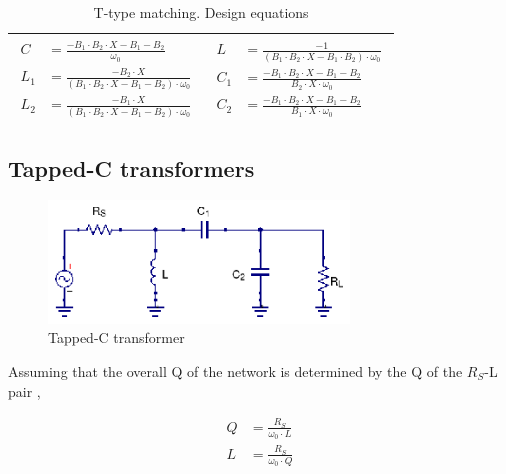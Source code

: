 \begin{table}[H]
\begin{tabular}{ | c | c | }
    \begin{minipage}{.4\textwidth}
         {\begin{align}
           C &= \frac{-B_1 \cdot B_2 \cdot X - B_1 - B_2}{\omega_0}\\
           L_1 &= \frac{-B_2 \cdot X}{(B_1 \cdot B_2 \cdot X - B_1 - B_2) \cdot \omega_0}\\
           L_2 &= \frac{-B_1 \cdot X}{(B_1 \cdot B_2 \cdot X - B_1 - B_2) \cdot \omega_0}
         \end{align}}
    \end{minipage}
    &
        \begin{minipage}{.4\textwidth}
         {\begin{align}
           L &= \frac{-1}{(B_1 \cdot B_2 \cdot X - B_1 \cdot B_2) \cdot \omega_0}\\
           C_1 &= \frac{-B_1 \cdot B_2 \cdot X - B_1 - B_2}{B_2 \cdot X \cdot \omega_0}\\
           C_2 &= \frac{-B_1 \cdot B_2 \cdot X - B_1 - B_2}{B_1 \cdot X \cdot \omega_0}
         \end{align}}
    \end{minipage}
    \\ \hline
  \end{tabular}
  \caption{T-type matching. Design equations}
  \label{tbl:tee-matching}
\end{table}

\subsection{Tapped-C transformers}

\begin{figure}[H]
\centering
\includegraphics[width=80mm]{Tapped-C-Transformer}
\caption{Tapped-C transformer}
\label{fig:tapped-c-transformer}
\end{figure}

\noindent Assuming that the overall Q of the network is determined by the Q of the $R_S$-L pair \cite{TheDesignofCMOSRFIC}, 

\begin{align}
  Q &= \frac{R_S}{\omega_0 \cdot L}\\
  L &= \frac{R_S}{\omega_0 \cdot Q}
\end{align}

